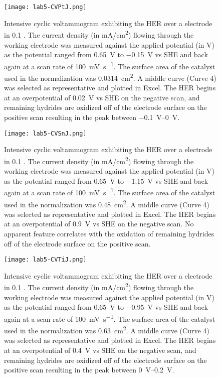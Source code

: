 \documentclass[../labs.tex]{subfiles}
\begin{document}
\begin{figure}[H]
    \centering
    \texttt{[image: lab5-CVPtJ.png]}
    \caption{Intensive cyclic voltammogram exhibiting the HER over a  electrode in \SI{0.1}{\molar} . The current density (in \si[per-mode=symbol]{\milli\ampere\per\centi\meter\squared}) flowing through the working electrode was measured against the applied potential (in \si{\volt}) as the potential ranged from \SI{0.65}{\volt} to \SI{-0.15}{\volt} vs SHE and back again at a scan rate of \SI[per-mode=symbol]{100}{\milli\volt\per\second}. The surface area of the catalyst used in the normalization was \SI{0.0314}{\centi\meter\squared}. A middle curve (Curve 4) was selected as representative and plotted in Excel. The HER begins at an overpotential of \SI{0.02}{\volt} vs SHE on the negative scan, and remaining hydrides are oxidized off of the electrode surface on the positive scan resulting in the peak between \SIrange{-0.1}{0}{\volt}.}
    \label{fig:CVPtJ}
\end{figure}

\begin{figure}[H]
    \centering
    \texttt{[image: lab5-CVSnJ.png]}
    \caption{Intensive cyclic voltammogram exhibiting the HER over a  electrode in \SI{0.1}{\molar} . The current density (in \si[per-mode=symbol]{\milli\ampere\per\centi\meter\squared}) flowing through the working electrode was measured against the applied potential (in \si{\volt}) as the potential ranged from \SI{0.65}{\volt} to \SI{-1.15}{\volt} vs SHE and back again at a scan rate of \SI[per-mode=symbol]{100}{\milli\volt\per\second}. The surface area of the catalyst used in the normalization was \SI{0.48}{\centi\meter\squared}. A middle curve (Curve 4) was selected as representative and plotted in Excel. The HER begins at an overpotential of \SI{0.9}{\volt} vs SHE on the negative scan. No apparent feature correlates with the oxidation of remaining hydrides off of the electrode surface on the positive scan.}
    \label{fig:CVSnJ}
\end{figure}

\begin{figure}[H]
    \centering
    \texttt{[image: lab5-CVTiJ.png]}
    \caption{Intensive cyclic voltammogram exhibiting the HER over a  electrode in \SI{0.1}{\molar} . The current density (in \si[per-mode=symbol]{\milli\ampere\per\centi\meter\squared}) flowing through the working electrode was measured against the applied potential (in \si{\volt}) as the potential ranged from \SI{0.65}{\volt} to \SI{-0.95}{\volt} vs SHE and back again at a scan rate of \SI[per-mode=symbol]{100}{\milli\volt\per\second}. The surface area of the catalyst used in the normalization was \SI{0.63}{\centi\meter\squared}. A middle curve (Curve 4) was selected as representative and plotted in Excel. The HER begins at an overpotential of \SI{0.4}{\volt} vs SHE on the negative scan, and remaining hydrides are oxidized off of the electrode surface on the positive scan resulting in the peak between \SIrange{0}{0.2}{\volt}.}
    \label{fig:CVTiJ}
\end{figure}
\end{document}

